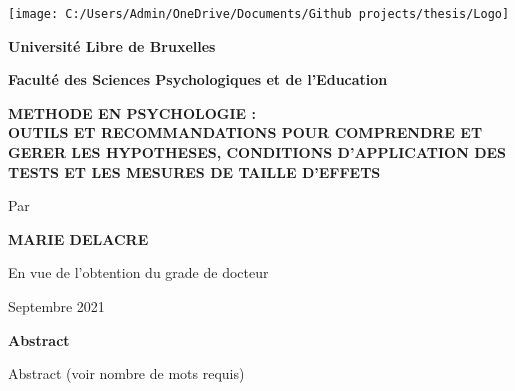 \documentclass[
  12pt,
  french,
]{article}
\author{}
\date{\vspace{-2.5em}}
\begin{document}
\allsectionsfont{\centering}
\subsectionfont{\raggedright}
\subsubsectionfont{\raggedright}


\begin{centering}

\vspace{3cm}


\texttt{[image: C:/Users/Admin/OneDrive/Documents/Github projects/thesis/Logo]} 

\vspace{1cm}

\Large
{\bf Université Libre de Bruxelles}

\Large
{\bf Faculté des Sciences Psychologiques et de l'Education}

\vspace{1cm}

\Large

\doublespacing
{\bf METHODE EN PSYCHOLOGIE : \\OUTILS ET RECOMMANDATIONS POUR COMPRENDRE ET GERER LES HYPOTHESES, CONDITIONS D'APPLICATION DES TESTS ET LES MESURES DE TAILLE D'EFFETS}

\vspace{1 cm}

\normalsize
\singlespacing
Par

\vspace{0.5 cm}

\Large

{\bf MARIE DELACRE}

\vspace{1.5 cm}

En vue de l'obtention du grade de docteur

\vspace{1.5 cm}

\normalsize
Septembre 2021

\end{centering}

\newpage


\begin{centering}

{\bf Abstract}

\end{centering}


Abstract (voir nombre de mots requis)

\end{document}
